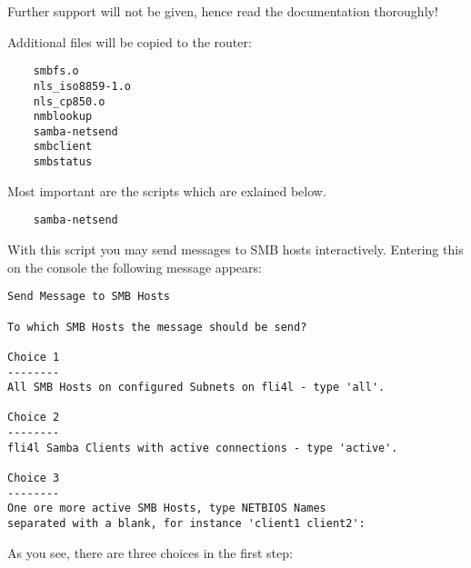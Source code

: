   Further support will not be given, hence read the documentation
  thoroughly!

  Additional files will be copied to the router:

\begin{example}
\begin{verbatim}
    smbfs.o
    nls_iso8859-1.o
    nls_cp850.o
    nmblookup
    samba-netsend
    smbclient
    smbstatus
\end{verbatim}
\end{example}

    Most important are the scripts which are exlained below.\\

\begin{verbatim}
    samba-netsend
\end{verbatim}

    With this script you may send messages to SMB hosts interactively.
    Entering this on the console the following message appears:

\begin{verbatim}
Send Message to SMB Hosts

To which SMB Hosts the message should be send?

Choice 1
--------
All SMB Hosts on configured Subnets on fli4l - type 'all'.

Choice 2
--------
fli4l Samba Clients with active connections - type 'active'.

Choice 3
--------
One ore more active SMB Hosts, type NETBIOS Names
separated with a blank, for instance 'client1 client2':
\end{verbatim}

As you see, there are three choices in the first step:

